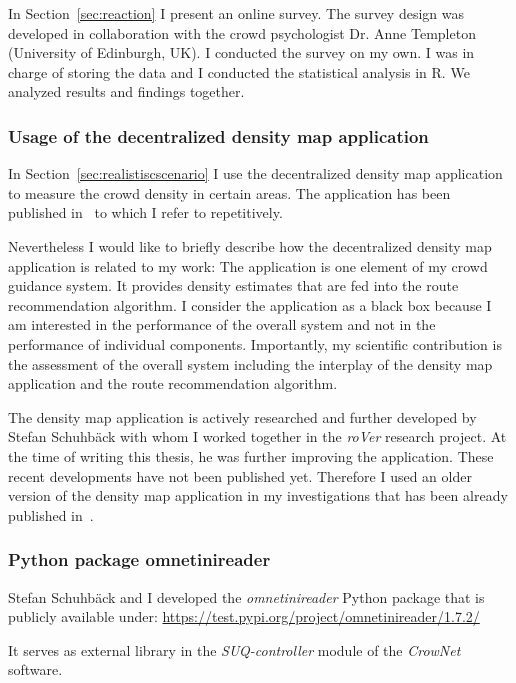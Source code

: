 %
In Section~\ref{sec:reaction} I present an online survey. The survey design was developed in collaboration with the crowd psychologist Dr. Anne Templeton (University of Edinburgh, UK). I conducted the survey on my own. I was in charge of storing the data and I conducted the statistical analysis in R. We analyzed results and findings together. 

\subsubsection{Usage of the decentralized density map application}
In Section~\ref{sec:realistiscscenario} I use the decentralized density map application to measure the crowd density in certain areas. The application has been published in~\cite{schuhbaeck-2021-com,schuhbaeck-2023-com} to which I refer to repetitively. 

Nevertheless I would like to briefly describe how the decentralized density map application is related to my work: 
The application is one element of my crowd guidance system. It provides density estimates that are fed into the route recommendation algorithm. I consider the application as a black box because I am interested in the performance of the overall system and not in the performance of individual components. Importantly, my scientific contribution is the assessment of the overall system including the interplay of the density map application and the route recommendation algorithm. 

The density map application is actively researched and further developed by Stefan Schuhbäck with whom I worked together in the \textit{roVer} research project. At the time of writing this thesis, he was further improving the application. These recent developments have not been published yet. Therefore I used an older version of the density map application in my investigations that has been already published in~\cite{schuhbaeck-2021-com,schuhbaeck-2023-com}. 


\subsubsection{Python package omnetinireader}
Stefan Schuhbäck and I developed the \textit{omnetinireader} Python package that is publicly available under:
\url{https://test.pypi.org/project/omnetinireader/1.7.2/}

It serves as external library in the \textit{SUQ-controller} module of the \textit{CrowNet} software.

